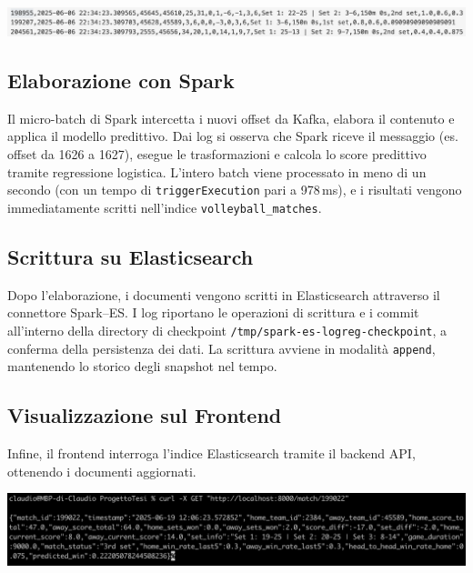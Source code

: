\documentclass[a4paper,12pt]{report}
\begin{document}
\noindent\begin{minipage}{\textwidth}
  \centering
    \includegraphics[width=\textwidth]{snapshoat.png}
    \label{fig:dati grezzi}
\end{minipage}

\subsection*{Elaborazione con Spark}
Il micro-batch di Spark intercetta i nuovi offset da Kafka, elabora il contenuto e applica il modello predittivo. Dai log si osserva che Spark riceve il messaggio (es. offset da 1626 a 1627), esegue le trasformazioni e calcola lo score predittivo tramite regressione logistica. L'intero batch viene processato in meno di un secondo (con un tempo di \texttt{triggerExecution} pari a 978\,ms), e i risultati vengono immediatamente scritti nell’indice \texttt{volleyball\_matches}.

\subsection*{Scrittura su Elasticsearch}
Dopo l'elaborazione, i documenti vengono scritti in Elasticsearch attraverso il connettore Spark--ES. I log riportano le operazioni di scrittura e i commit all’interno della directory di checkpoint \texttt{/tmp/spark-es-logreg-checkpoint}, a conferma della persistenza dei dati. La scrittura avviene in modalità \texttt{append}, mantenendo lo storico degli snapshot nel tempo.

\subsection*{Visualizzazione sul Frontend}
Infine, il frontend interroga l’indice Elasticsearch tramite il backend API, ottenendo i documenti aggiornati. 

\noindent\begin{minipage}{\textwidth}
  \centering
    \includegraphics[width=\textwidth]{API.png}
    \label{fig:API REST}
\end{minipage}
\end{document}
